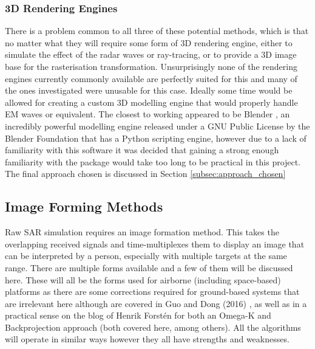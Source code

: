 \subsubsection{3D Rendering Engines}
There is a problem common to all three of these potential methods, which is that no matter what they will require some form of 3D rendering engine, either to simulate the effect of the radar waves or ray-tracing, or to provide a 3D image base for the rasterisation transformation. Unsurprisingly none of the rendering engines currently commonly available are perfectly suited for this and many of the ones investigated were unusable for this case. Ideally some time would be allowed for creating a custom 3D modelling engine that would properly handle EM waves or equivalent. The closest to working appeared to be Blender \cite{foundationBlenderOrgHome}, an incredibly powerful modelling engine released under a GNU Public License by the Blender Foundation that has a Python scripting engine, however due to a lack of familiarity with this software it was decided that gaining a strong enough familiarity with the package would take too long to be practical in this project. The final approach chosen is discussed in Section \ref{subsec:approach_chosen}
\subsection{Image Forming Methods}
Raw SAR simulation requires an image formation method. This takes the overlapping received signals and time-multiplexes them to display an image that can be interpreted by a person, especially with multiple targets at the same range. There are multiple forms available and a few of them will be discussed here. These will all be the forms used for airborne (including space-based) platforms as there are some corrections required for ground-based systems that are irrelevant here although are covered in Guo and Dong (2016) \cite{guoModifiedOmegaKAlgorithm2016}, as well as in a practical sense on the blog of Henrik Forstén for both an Omega-K \cite{forstenSyntheticapertureRadarImaging2019} and Backprojection \cite{forstenBackprojectionBackpropagation2019} approach (both covered here, among others). All the algorithms will operate in similar ways however they all have strengths and weaknesses. 
